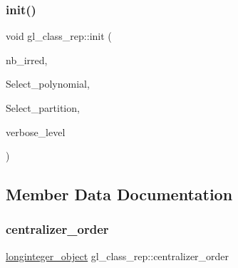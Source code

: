 \mbox{\label{classgl__class__rep_a4702a1e8737629277afbd2f7cb083850}} 
\subsubsection{\texorpdfstring{init()}{init()}}
{\footnotesize\ttfamily void gl\+\_\+class\+\_\+rep\+::init (\begin{DoxyParamCaption}\item[{\mbox{\hyperlink{galois_8h_a09fddde158a3a20bd2dcadb609de11dc}{I\+NT}}}]{nb\+\_\+irred,  }\item[{\mbox{\hyperlink{galois_8h_a09fddde158a3a20bd2dcadb609de11dc}{I\+NT}} $\ast$}]{Select\+\_\+polynomial,  }\item[{\mbox{\hyperlink{galois_8h_a09fddde158a3a20bd2dcadb609de11dc}{I\+NT}} $\ast$}]{Select\+\_\+partition,  }\item[{\mbox{\hyperlink{galois_8h_a09fddde158a3a20bd2dcadb609de11dc}{I\+NT}}}]{verbose\+\_\+level }\end{DoxyParamCaption})}



\subsection{Member Data Documentation}
\mbox{\label{classgl__class__rep_a4243559e09c5b586ca14b8271bf35790}} 
\subsubsection{\texorpdfstring{centralizer\+\_\+order}{centralizer\_order}}
{\footnotesize\ttfamily \mbox{\hyperlink{classlonginteger__object}{longinteger\+\_\+object}} gl\+\_\+class\+\_\+rep\+::centralizer\+\_\+order}

\mbox{\label{classgl__class__rep_a30489d66f224e7ed20435998af60f892}} 
